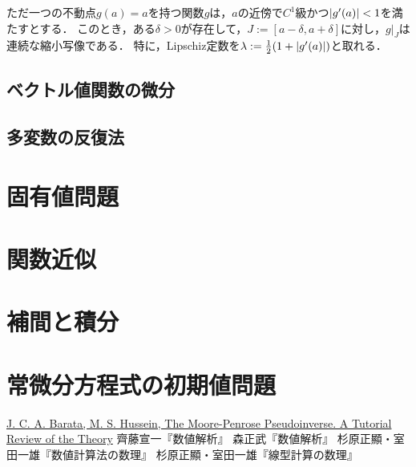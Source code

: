 \documentclass[uplatex, dvipdfmx]{jsreport}
\begin{document}
\begin{proposition}
    ただ一つの不動点$g(a)=a$を持つ関数$g$は，$a$の近傍で$C^1$級かつ$\lvert g'(a)\rvert<1$を満たすとする．
    このとき，ある$\delta>0$が存在して，$J:=[a-\delta,a+\delta]$に対し，$g|_J$は連続な縮小写像である．
    特に，Lipschiz定数を$\lambda:=\frac{1}{2}(1+\lvert g'(a)\rvert)$と取れる．
\end{proposition}

\section{ベクトル値関数の微分}

\section{多変数の反復法}

\chapter{固有値問題}

\chapter{関数近似}

\chapter{補間と積分}

\chapter{常微分方程式の初期値問題}



\begin{thebibliography}{9}
    \href{https://arxiv.org/abs/1110.6882v1}{J. C. A. Barata, M. S. Hussein, The Moore-Penrose Pseudoinverse. A Tutorial Review of the Theory}
    齊藤宣一『数値解析』
    森正武『数値解析』
    杉原正顯・室田一雄『数値計算法の数理』
    杉原正顯・室田一雄『線型計算の数理』
\end{thebibliography}
\end{document}
